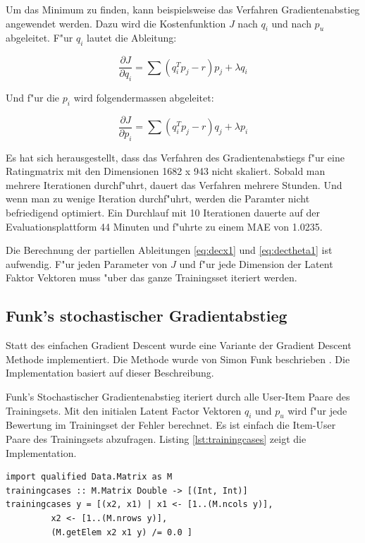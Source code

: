 \documentclass[a4paper, 12pt]{article}
\begin{document}
Um das Minimum zu finden, kann beispielsweise das Verfahren Gradientenabstieg angewendet werden. Dazu wird die Kostenfunktion $J$ nach $q_i$ und nach $p_u$ abgeleitet. F"ur $q_i$ lautet die Ableitung:

\begin{equation}
  \label{eq:decx1}
  \frac{ \partial J }{ \partial q_i } = \sum (q_i^T p_j - r) p_j + \lambda q_i
\end{equation}

Und f"ur die $p_i$ wird folgendermassen abgeleitet:

\begin{equation}
  \label{eq:dectheta1}
  \frac{ \partial J }{ \partial p_i } = \sum (q_i^T p_j - r) q_j + \lambda p_i
\end{equation}

Es hat sich herausgestellt, dass das Verfahren des Gradientenabstiegs f"ur eine Ratingmatrix mit den Dimensionen 1682 x 943 nicht skaliert. Sobald man mehrere Iterationen durchf"uhrt, dauert das Verfahren mehrere Stunden. Und wenn man zu wenige Iteration durchf"uhrt, werden die Paramter nicht befriedigend optimiert. Ein Durchlauf mit 10 Iterationen dauerte auf der Evaluationsplattform 44 Minuten und f"uhrte zu einem MAE von 1.0235.

Die Berechnung der partiellen Ableitungen \ref{eq:decx1} und \ref{eq:dectheta1} ist aufwendig. F"ur jeden Parameter von $J$ und f"ur jede Dimension der Latent Faktor Vektoren muss "uber das ganze Trainingsset iteriert werden.

\subsection{Funk's stochastischer Gradientabstieg}
\label{sec:funksvd}

Statt des einfachen Gradient Descent wurde eine Variante der Gradient Descent Methode implementiert. Die Methode wurde von Simon Funk beschrieben \cite{funk}. Die Implementation basiert auf dieser Beschreibung.

Funk's Stochastischer Gradientenabstieg iteriert durch alle User-Item Paare des Trainingsets. Mit den initialen Latent Factor Vektoren $q_i$ und $p_u$ wird f"ur jede Bewertung im Trainingset der Fehler berechnet. Es ist einfach die Item-User Paare des Trainingsets abzufragen. Listing \ref{lst:trainingcases} zeigt die Implementation.

\begin{lstlisting}[caption=Abfrage des Trainingsets,label=lst:trainingcases]
import qualified Data.Matrix as M  
trainingcases :: M.Matrix Double -> [(Int, Int)]
trainingcases y = [(x2, x1) | x1 <- [1..(M.ncols y)], 
         x2 <- [1..(M.nrows y)],
         (M.getElem x2 x1 y) /= 0.0 ]
\end{lstlisting}
\end{document}
